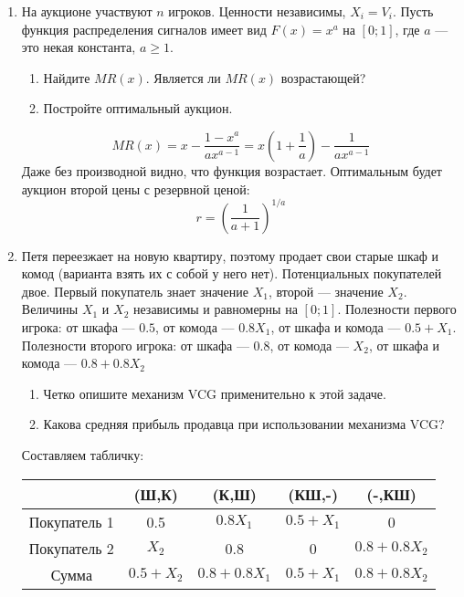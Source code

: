 \begin{enumerate}

\item На аукционе участвуют $ n $ игроков. Ценности независимы, $ X_{i}=V_{i}$. Пусть функция распределения сигналов имеет вид $ F(x)=x^{a} $ на $ [0;1] $, где $ a $ --- это некая константа, $ a\geq 1 $. 
\begin{enumerate}
\item Найдите $ MR(x) $. Является ли $ MR(x) $ возрастающей?
\item Постройте оптимальный аукцион.
\end{enumerate}

\begin{equation}
MR(x)=x-\frac{1-x^{a}}{ax^{a-1}}=x\left(1+\frac{1}{a}\right)-\frac{1}{ax^{a-1}}
\end{equation}
Даже без производной видно, что функция возрастает. Оптимальным будет аукцион второй цены с резервной ценой:
\begin{equation}
r=\left(\frac{1}{a+1}\right)^{1/a}
\end{equation}

\item Петя переезжает на новую квартиру, поэтому продает свои старые шкаф и комод (варианта взять их с собой у него нет).  Потенциальных покупателей двое. Первый покупатель знает значение $ X_{1} $, второй --- значение $ X_{2} $. Величины  $ X_{1} $ и  $ X_{2} $ независимы и равномерны на $ [0;1] $. Полезности первого игрока: от шкафа --- $ 0.5 $, от комода --- $ 0.8X_{1} $, от шкафа и комода --- $ 0.5+X_{1} $. Полезности второго игрока: от шкафа --- $ 0.8 $, от комода --- $ X_{2} $, от шкафа и комода --- $ 0.8+0.8X_{2}$
\begin{enumerate}
\item Четко опишите механизм VCG применительно к этой задаче.
\item Какова средняя прибыль продавца при использовании механизма VCG?
\end{enumerate}

Составляем табличку:

\begin{tabular}{c|cccc}
& (Ш,К) & (К,Ш) & (КШ,-) & (-,КШ) \\ 
\hline 
Покупатель 1 & 0.5 & $ 0.8X_{1} $ & $ 0.5+X_{1} $ & 0 \\ 
Покупатель 2 & $ X_{2} $ & 0.8 & 0 & $ 0.8+0.8X_{2} $ \\ 
Сумма & $ 0.5+X_{2} $& $ 0.8+0.8X_{1} $ & $ 0.5+X_{1} $ & $ 0.8+0.8X_{2} $ \\
\end{tabular} 


\end{enumerate}
